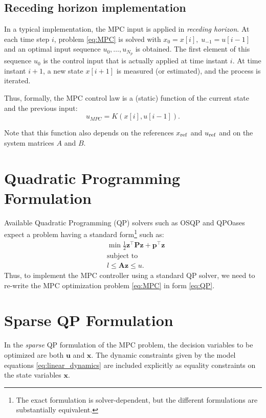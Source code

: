 \documentclass[a4paper,12pt,fleqn]{article}
\newcommand{\lQP}{l}
\newcommand{\uQP}{u}
\newcommand{\AQP}{\mathbf{A}}
\newcommand{\PQP}{\mathbf{P}}
\newcommand{\qQP}{\mathbf{p}}
\newcommand{\xQP}{\mathbf{z}}
\newcommand{\varxvec}{\mathbf{x}}
\newcommand{\varuvec}{\mathbf{u}}
\newcommand{\Np}{{N_p}}
\begin{document}
\subsection{Receding horizon implementation}
In a typical implementation, the MPC input is applied in \emph{receding horizon}. At each time step $i$, problem \eqref{eq:MPC} is solved with $x_0=x[i],\;u_{-1}=u[{i-1}]$ and an optimal input sequence $u_{0},\dots,u_{\Np}$ is obtained. The first element of this sequence $u_0$ is the control input that is actually applied at time instant $i$. At time instant $i+1$, a new state $x[i+1]$ is measured (or estimated), and the process is iterated. 

Thus, formally, the MPC control law is a (static) function of the current state and the previous input:
\begin{equation}
 u_{MPC} = K(x[i], u[i-1]).
\end{equation}

Note that this function also depends on the references $x_{\rm ref}$ and $u_{\rm ref}$ and on the system matrices $A$ and $B$.

\section{Quadratic Programming Formulation}
Available Quadratic Programming (QP) solvers such as OSQP and QPOases expect a problem having a standard form\footnote{The exact  formulation is solver-dependent, but the different formulations are substantially equivalent.} such as:
\begin{subequations}
\label{eq:QP}
\begin{align}
 &\min \frac{1}{2} \xQP^\top \PQP \xQP +  \qQP^\top \xQP \\
 &\text{subject to} \nonumber \\
 &\lQP \leq \AQP \xQP \leq \uQP.
\end{align}
\end{subequations}
Thus, to implement the MPC controller using a standard QP solver, we need to re-write the MPC optimization problem \eqref{eq:MPC} in form
\eqref{eq:QP}. 

\section{Sparse QP Formulation}
\label{sec:sparse}
In the \emph{sparse} QP formulation of the MPC problem, the decision variables to be optimized are both $\varuvec$ and $\varxvec$. The dynamic constraints given by the model equations \eqref{eq:linear_dynamics} are included explicitly as equality constraints on the state variables 
$\varxvec$.
\end{document}
